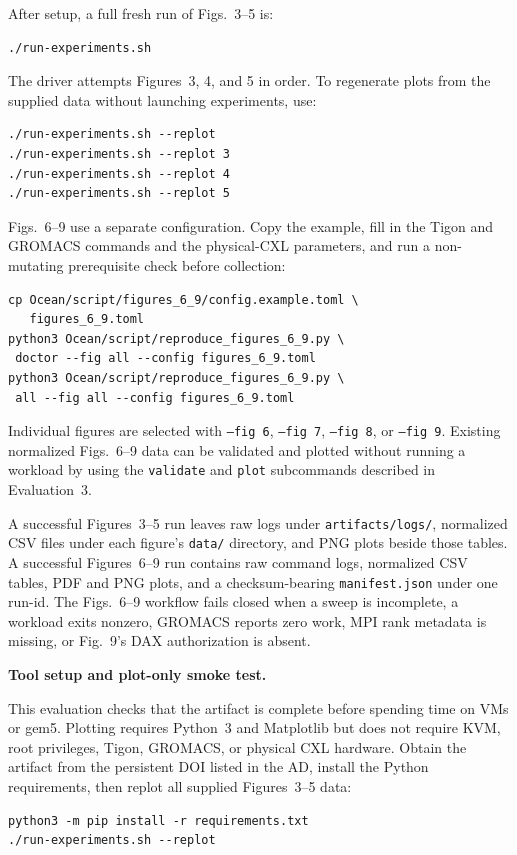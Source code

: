 \documentclass[conference]{IEEEtran}
\begin{document}
\artcomp

After setup, a full fresh run of Figs.~3--5 is:
\begin{verbatim}
./run-experiments.sh
\end{verbatim}
The driver attempts Figures~3, 4, and 5 in order.  To regenerate plots from
the supplied data without launching experiments, use:
\begin{verbatim}
./run-experiments.sh --replot
./run-experiments.sh --replot 3
./run-experiments.sh --replot 4
./run-experiments.sh --replot 5
\end{verbatim}

Figs.~6--9 use a separate configuration.  Copy the example, fill in the
Tigon and GROMACS commands and the physical-CXL parameters, and run a
non-mutating prerequisite check before collection:
\begin{verbatim}
cp Ocean/script/figures_6_9/config.example.toml \
   figures_6_9.toml
python3 Ocean/script/reproduce_figures_6_9.py \
 doctor --fig all --config figures_6_9.toml
python3 Ocean/script/reproduce_figures_6_9.py \
 all --fig all --config figures_6_9.toml
\end{verbatim}
Individual figures are selected with \texttt{--fig 6}, \texttt{--fig 7},
\texttt{--fig 8}, or \texttt{--fig 9}.  Existing normalized Figs.~6--9 data
can be validated and plotted without running a workload by using the
\texttt{validate} and \texttt{plot} subcommands described in Evaluation~3.

\artout

A successful Figures~3--5 run leaves raw logs under
\texttt{artifacts/logs/}, normalized CSV files under each figure's
\texttt{data/} directory, and PNG plots beside those tables.  A successful
Figures~6--9 run contains raw command logs, normalized CSV tables, PDF and PNG
plots, and a checksum-bearing \texttt{manifest.json} under one run-id.  The
Figs.~6--9 workflow fails closed when a sweep is incomplete, a workload exits
nonzero, GROMACS reports zero work, MPI rank metadata is missing, or Fig.~9's
DAX authorization is absent.

\appendixAE

\arteval{1}
\noindent\textbf{Tool setup and plot-only smoke test.}

\artin

This evaluation checks that the artifact is complete before spending time on
VMs or gem5.  Plotting requires Python~3 and Matplotlib but does not require
KVM, root privileges, Tigon, GROMACS, or physical CXL hardware.  Obtain the
artifact from the persistent DOI listed in the AD, install the Python
requirements, then replot all supplied Figures~3--5 data:
\begin{verbatim}
python3 -m pip install -r requirements.txt
./run-experiments.sh --replot
\end{verbatim}
\end{document}
